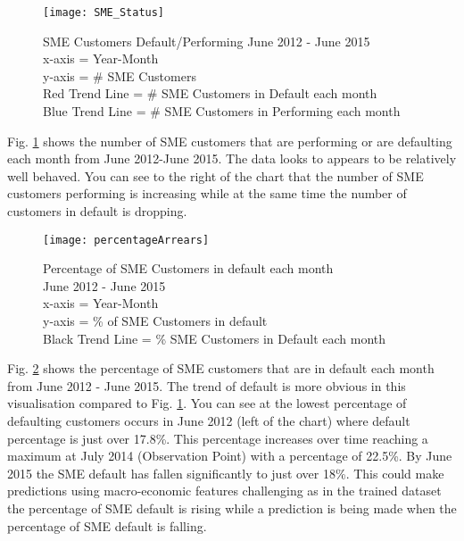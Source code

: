 \begin{figure}[H]
	\texttt{[image: SME\_Status]}
	\caption{SME Customers Default/Performing June 2012 - June 2015 \\ x-axis = Year-Month  \\
		y-axis = \# SME Customers
		\\Red Trend Line = \# SME Customers in Default each month
		\\Blue Trend Line = \# SME Customers in Performing each month}
	\label{fig:SME_Status}
\end{figure}

Fig. \ref{fig:SME_Status} shows the number of SME customers that are performing or are defaulting each month from June 2012-June 2015. The data looks to appears to be relatively well behaved. You can see to the right of the chart that the number of SME customers performing is increasing while at the same time the number of customers in default is dropping. 

\begin{figure}[H]
	\texttt{[image: percentageArrears]}
	\caption{Percentage of SME Customers in default each month 
		\\ June 2012 - June 2015
		\\ x-axis = Year-Month \\
		y-axis = \% of SME Customers in default
		\\Black Trend Line = \% SME Customers in Default each month}
	\label{fig:percentageArrears}
\end{figure}

Fig. \ref{fig:percentageArrears} shows the percentage of SME customers that are in default each month from June 2012 - June 2015. The trend of default is more obvious in this visualisation compared to Fig. \ref{fig:SME_Status}. You can see at the lowest percentage of defaulting customers occurs in June 2012 (left of the chart) where default percentage is just over 17.8\%. This percentage increases over time reaching a maximum at July 2014 (Observation Point) with a percentage of 22.5\%. By June 2015 the SME default has fallen significantly to just over 18\%. This could make predictions using macro-economic features challenging as in the trained dataset the percentage of SME default is rising while a prediction is being made when the percentage of SME default is falling.


